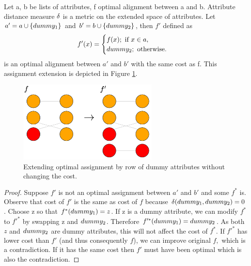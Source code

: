 \begin{theorem}
	\label{theorem:extendingOfAlignment}
	Let a, b be lists of attributes, f optimal alignment between a and b. Attribute distance measure $\delta$ is a metric on the extended space of attributes. Let $a' = a \cup \{dummy_1\}$ and $b' = b \cup \{dummy_2\}$, then $f'$ defined as 
	\begin{equation*}
	f'(x)=
	\begin{cases}
	f(x); \mbox{ if } x \in a, \\
	dummy_2; \mbox{ otherwise}.
	\end{cases}
	\end{equation*}
	 is an optimal alignment between $a'$ and $b'$ with the same cost as f. This assignment extension is depicted in 
	 Figure \ref{fig:assignmentExtension}. 
	 \begin{figure}	
	 	\includegraphics[width=7cm]{Images/assignmentExtension.png}
	 	\centering
	 	\caption{Extending optimal assignment by row of dummy attributes without changing the cost.}		\label{fig:assignmentExtension}	
	 \end{figure}
	\begin{proof}
		Suppose $f'$ is not an optimal assignment between $a'$ and $b'$ and some $f^*$ is. Observe that cost of $f'$ is the same as cost of $f$ because $\delta(dummy_1, dummy_2)=0$. Choose z so that $f^*(dummy_1)=z$. If z is a dummy attribute, we can modify $f^*$ to $f'^*$ by swapping z and $dummy_2$. Therefore $f'^*(dummy_1)=dummy_2$. As both $z$ and $dummy_2$ are dummy attributes, this will not affect the cost of $f^*$. If $f'^*$ has lower cost than $f'$ (and thus consequently $f$), we can improve original $f,$ which is a contradiction. If it has the same cost then $f'$ must have been optimal which is also the contradiction. 
		

\end{proof}
\end{theorem}
